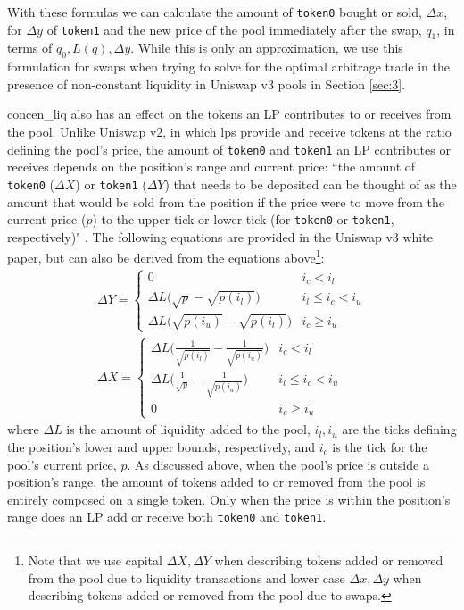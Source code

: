 \documentclass[11pt]{article}
\begin{document}
With these formulas we can calculate the amount of \texttt{token0} bought or sold, $\Delta x$, for $\Delta y$ of \texttt{token1} and the new price of the pool immediately after the swap, $q_1$, in terms of $q_0, L(q), \Delta y$. While this is only an approximation, we use this formulation for swaps when trying to solve for the optimal arbitrage trade in the presence of non-constant liquidity in Uniswap v3 pools in Section \ref{sec:3}.

\Gls{concen_liq} also has an effect on the tokens an LP contributes to or receives from the pool. Unlike Uniswap v2, in which \glspl{lp} provide and receive tokens at the ratio defining the pool's price, the amount of \texttt{token0} and \texttt{token1} an LP contributes or receives depends on the position's range and current price: ``the amount of \texttt{token0} ($\Delta X$) or \texttt{token1} ($\Delta Y$) that needs to be
deposited can be thought of as the amount that would be sold from
the position if the price were to move from the current price ($p$) to
the upper tick or lower tick (for \texttt{token0} or \texttt{token1}, respectively)" \citep{Uniswapv3}. The following equations are provided in the Uniswap v3 white paper, but can also be derived from the equations above\footnote{Note that we use capital $\Delta X, \Delta Y$ when describing tokens added or removed from the pool due to liquidity transactions and lower case $\Delta x, \Delta y$ when describing tokens added or removed from the pool due to swaps.}:
\begin{gather}
    \Delta Y =
    \begin{cases}
        0 & i_c < i_l \\
        \Delta L \big( \sqrt{p} - \sqrt{p(i_l)} \big) & i_l \le i_c < i_u \\
        \Delta L \big( \sqrt{p(i_u)} - \sqrt{p(i_l)} \big) & i_c \ge i_u
    \end{cases} \label{eq:17}\\
    \Delta X =
    \begin{cases}
        \Delta L \bigg( \frac{1}{\sqrt{p(i_l)}} - \frac{1}{\sqrt{p(i_u)}} \bigg) & i_c < i_l \\
        \Delta L \bigg( \frac{1}{\sqrt{p}} - \frac{1}{\sqrt{p(i_u)}} \bigg) & i_l \le i_c < i_u \\
        0 & i_c \ge i_u
    \end{cases} \label{eq:18}
\end{gather}
where $\Delta L$ is the amount of liquidity added to the pool, $i_l, i_u$ are the ticks defining the position's lower and upper bounds, respectively, and $i_c$ is the tick for the pool's current price, $p$. As discussed above, when the pool's price is outside a position's range, the amount of tokens added to or removed from the pool is entirely composed on a single token. Only when the price is within the position's range does an LP add or receive both \texttt{token0} and \texttt{token1}.
\end{document}
